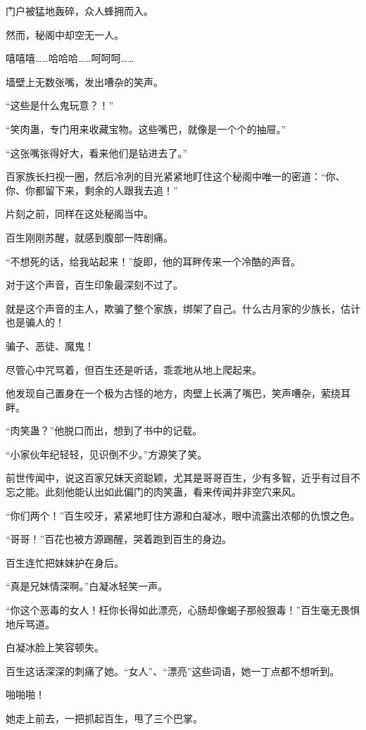 \begin{this_body}
门户被猛地轰碎，众人蜂拥而入。

然而，秘阁中却空无一人。

嘻嘻嘻……哈哈哈……呵呵呵……

墙壁上无数张嘴，发出嘈杂的笑声。

“这些是什么鬼玩意？！”

“笑肉蛊，专门用来收藏宝物。这些嘴巴，就像是一个个的抽屉。”

“这张嘴张得好大，看来他们是钻进去了。”

百家族长扫视一圈，然后冷冽的目光紧紧地盯住这个秘阁中唯一的密道：“你、你、你都留下来，剩余的人跟我去追！”

片刻之前，同样在这处秘阁当中。

百生刚刚苏醒，就感到腹部一阵剧痛。

“不想死的话，给我站起来！”旋即，他的耳畔传来一个冷酷的声音。

对于这个声音，百生印象最深刻不过了。

就是这个声音的主人，欺骗了整个家族，绑架了自己。什么古月家的少族长，估计也是骗人的！

骗子、恶徒、魔鬼！

尽管心中咒骂着，但百生还是听话，乖乖地从地上爬起来。

他发现自己置身在一个极为古怪的地方，肉壁上长满了嘴巴，笑声嘈杂，萦绕耳畔。

“肉笑蛊？”他脱口而出，想到了书中的记载。

“小家伙年纪轻轻，见识倒不少。”方源笑了笑。

前世传闻中，说这百家兄妹天资聪颖，尤其是哥哥百生，少有多智，近乎有过目不忘之能。此刻他能认出如此偏门的肉笑蛊，看来传闻并非空穴来风。

“你们两个！”百生咬牙，紧紧地盯住方源和白凝冰，眼中流露出浓郁的仇恨之色。

“哥哥！”百花也被方源踢醒，哭着跑到百生的身边。

百生连忙把妹妹护在身后。

“真是兄妹情深啊。”白凝冰轻笑一声。

“你这个恶毒的女人！枉你长得如此漂亮，心肠却像蝎子那般狠毒！”百生毫无畏惧地斥骂道。

白凝冰脸上笑容顿失。

百生这话深深的刺痛了她。“女人”、“漂亮”这些词语，她一丁点都不想听到。

啪啪啪！

她走上前去，一把抓起百生，甩了三个巴掌。


\end{this_body}

